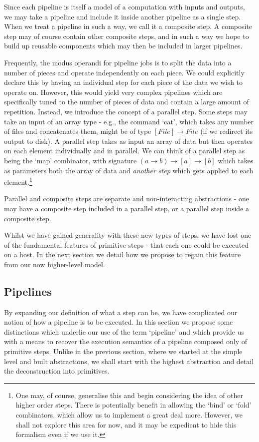 \documentclass[10pt,a4paper]{article}
\newcommand{\npar}{\par\noindent\space}
\begin{document}
\npar Since each pipeline is itself a model of a computation with inputs and outputs, we may take a pipeline and include it inside another pipeline as a single step. When we treat a pipeline in such a way, we call it a \gls{composite step}. A composite step may of course contain other composite steps, and in such a way we hope to build up reusable components which may then be included in larger pipelines.
\npar Frequently, the modus operandi for pipeline jobs is to split the data into a number of pieces and operate independently on each piece. We could explicitly declare this by having an individual step for each piece of the data we wish to operate on. However, this would yield very complex pipelines which are specifically tuned to the number of pieces of data and contain a large amount of repetition. Instead, we introduce the concept of a parallel step. Some steps may take an input of an array type - e.g., the command `cat', which takes any number of files and concatenates them, might be of type $[File] \rightarrow File$ (if we redirect its output to disk). A parallel step takes as input an array of data but then operates on each element individually and in parallel. We can think of a parallel step as being the `map' combinator, with signature $(a \rightarrow b) \rightarrow [a] \rightarrow [b]$ which takes as parameters both the array of data and \textit{another step} which gets applied to each element.\footnote{One may, of course, generalise this and begin considering the idea of other higher order steps. There is potentially benefit in allowing the `bind' or `fold' combinators, which allow us to implement a great deal more. However, we shall not explore this area for now, and it may be expedient to hide this formalism even if we use it.}
\npar Parallel and composite steps are separate and non-interacting abstractions - one may have a composite step included in a parallel step, or a parallel step inside a composite step.
\npar Whilst we have gained generality with these new types of steps, we have lost one of the fundamental features of \glspl{primitive step} - that each one could be executed on a host. In the next section we detail how we propose to regain this feature from our now higher-level model.

\subsection{Pipelines}
\npar By expanding our definition of what a step can be, we have complicated our notion of how a pipeline is to be executed. In this section we propose some distinctions which underlie our use of the term `pipeline' and which provide us with a means to recover the execution semantics of a pipeline composed only of primitive steps. Unlike in the previous section, where we started at the simple level and built abstractions, we shall start with the highest abstraction and detail the deconstruction into primitives.
\end{document}
